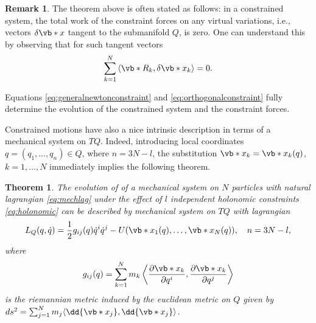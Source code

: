 \documentclass[english,fontsize=11pt,paper=b5]{scrbook}
\newtheorem{theorem}{Theorem}[chapter]
\theoremstyle{definition}
\newtheorem{remark}{Remark}[chapter]
\begin{document}
    \begin{remark}
      The theorem above is often stated as follows: in a constrained system, the total work of the constraint forces on any virtual variations, i.e., vectors $\delta\vb*{x}$ tangent to the submanifold $Q$, is zero.
      One can understand this by observing that for such tangent vectors
      \begin{equation}\label{eq:orthogonalconstraint}
        \sum_{k=1}^N \left\langle\vb*{R}_k, \delta\vb*{x}_k\right\rangle = 0.
      \end{equation}
    \end{remark}

    Equations \eqref{eq:generalnewtonconstraint} and \eqref{eq:orthogonalconstraint} fully determine the evolution of the constrained system and the constraint forces.

    Constrained motions have also a nice intrinsic description in terms of a mechanical system on $TQ$. Indeed, introducing local coordinates $q= (q_1, \ldots, q_n)\in Q$, where $n = 3N-l$, the substitution $\vb*{x}_k = \vb*{x}_k(q)$, $k=1,\ldots,N$ immediately implies the following theorem.

    \begin{theorem}
      The evolution of of a mechanical system on $N$ particles with natural lagrangian \eqref{eq:mechlag} under the effect of $l$ independent holonomic constraints \eqref{eq:holonomic} can be described by mechanical system on $TQ$ with lagrangian
      \begin{equation}
        L_Q(q,\dot q) = \frac12 g_{ij}(q)\dot q^i \dot q^j - U(\vb*{x}_1(q),\ldots,\vb*{x}_N(q)), \quad n = 3N-l,
      \end{equation}
      where
      \begin{equation}
        g_{ij}(q) = \sum_{k=1}^N m_k\left\langle\frac{\partial \vb*{x}_k}{\partial q^i},\frac{\partial \vb*{x}_k}{\partial q^j}\right\rangle
      \end{equation}
      is the riemannian metric induced by the euclidean metric on $Q$ given by
      $ds^2 = \sum_{j=1}^N m_j\langle\dd{\vb*{x}_j}, \dd{\vb*{x}_j}\rangle$.
    \end{theorem}
\end{document}
